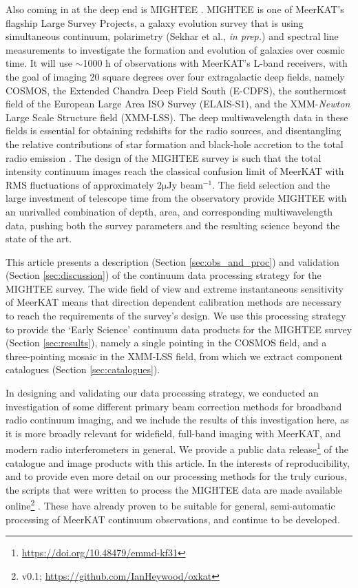 \documentclass[usenatbib,usedcolumn]{mnras}
\begin{document}
Also coming in at the deep end is MIGHTEE \citep[MeerKAT International Gigahertz Tiered Extragalactic Explorations;][]{jarvis2016}. MIGHTEE is one of MeerKAT's flagship Large Survey Projects, a galaxy evolution survey that is using simultaneous continuum, polarimetry (Sekhar et al., \emph{in prep.}) and spectral line \citep{maddox2021} measurements to investigate the formation and evolution of galaxies over cosmic time. It will use $\sim$1000 h of observations with MeerKAT's L-band receivers, with the goal of imaging 20 square degrees over four extragalactic deep fields, namely COSMOS, the Extended Chandra Deep Field South (E-CDFS), the southermost field of the European Large Area ISO Survey (ELAIS-S1), and the XMM-\emph{Newton} Large Scale Structure field (XMM-LSS). The deep multiwavelength data in these fields is essential for obtaining redshifts for the radio sources, and disentangling the relative contributions of star formation and black-hole accretion to the total radio emission \citep{white2017}. The design of the MIGHTEE survey is such that the total intensity continuum images reach the classical confusion limit of MeerKAT with RMS fluctuations of approximately 2$\mathrm{\mu}$Jy beam$^{-1}$. The field selection and the large investment of telescope time from the observatory provide MIGHTEE with an unrivalled combination of depth, area, and corresponding multiwavelength data, pushing both the survey parameters and the resulting science beyond the state of the art.

This article presents a description (Section \ref{sec:obs_and_proc}) and validation (Section \ref{sec:discussion}) of the continuum data processing strategy for the MIGHTEE survey. The wide field of view and extreme instantaneous sensitivity of MeerKAT means that direction dependent calibration methods are necessary to reach the requirements of the survey's design. We use this processing strategy to provide the `Early Science' continuum data products for the MIGHTEE survey (Section \ref{sec:results}), namely a single pointing in the COSMOS field, and a three-pointing mosaic in the XMM-LSS field, from which we extract component catalogues (Section \ref{sec:catalogues}). 

In designing and validating our data processing strategy, we conducted an investigation of some different primary beam correction methods for broadband radio continuum imaging, and we include the results of this investigation here, as it is more broadly relevant for widefield, full-band imaging with MeerKAT, and modern radio interferometers in general. We provide a public data release\footnote{\url{https://doi.org/10.48479/emmd-kf31}} of the catalogue and image products with this article. In the interests of reproducibility, and to provide even more detail on our processing methods for the truly curious, the scripts that were written to process the MIGHTEE data are made available online\footnote{v0.1; \url{https://github.com/IanHeywood/oxkat}} \citep{oxkat2020}. These have already proven to be suitable for general, semi-automatic processing of MeerKAT continuum observations, and continue to be developed.
\end{document}
